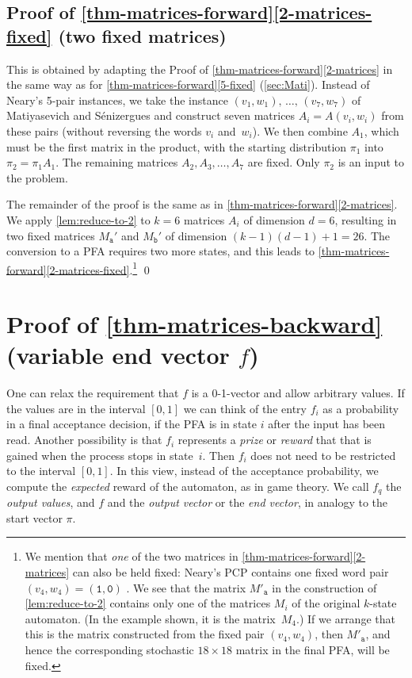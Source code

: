 \documentclass[a4paper,cleveref, autoref, thm-restate]{lipics-v2021}
\newcommand\eeta{f} %
\begin{document}
\subsection{Proof of
  \autoref{thm-matrices-forward}\ref{2-matrices-fixed}  (two fixed matrices)}

This is obtained by adapting the Proof of
\autoref{thm-matrices-forward}\ref{2-matrices}
in the same way as for
\autoref{thm-matrices-forward}\ref{5-fixed}
(\autoref{sec:Mati}).
Instead of Neary's 5-pair instances,
we take the instance
$(v_1,w_1),\,\ldots, \,(v_7,w_7)$
of
 Matiyasevich and S{\'e}nizergues %
and construct seven matrices
$A_i=A(v_i,w_i)$ from these pairs (without reversing the words
$v_i$ and~$w_i$).
We then
combine $A_1$, which must be the first matrix in the product, with the starting
distribution $\pi_1$ into $\pi_2 = \pi_1A_1$.
The remaining matrices $A_2,A_3,\ldots,A_7$ are fixed. Only $\pi_2$
is an input to the problem.

The remainder of the proof is the same as in \autoref{thm-matrices-forward}\ref{2-matrices}.
 We apply
\autoref{lem:reduce-to-2} to
$k=6$ matrices $A_i$ of dimension $d=6$, resulting in two fixed matrices
$M_{\mathtt{a}}'$ and
 $M_{\mathtt{b}}'$
 of dimension
 $(k-1)(d-1)+1=26$.
The conversion to a PFA requires two more states, and this leads to
\autoref{thm-matrices-forward}\ref{2-matrices-fixed}.\footnote
{We mention that \emph{one} of the two matrices in 
  \autoref{thm-matrices-forward}\ref{2-matrices} can also be held fixed:
Neary's PCP contains one fixed word pair
$(v_4,w_4)=(\mathtt{1},\mathtt{0})$
\cite[Theorem~11]{neary:PCP5:2015}.
We see that the matrix $M'_{\mathtt{a}}$ in the construction of
\autoref{lem:reduce-to-2} contains only one of the matrices
$M_i$ of the  original $k$-state automaton. (In the example shown, it is
the matrix~$M_4$.) If we arrange that this is the matrix
constructed from the fixed pair
$(v_4,w_4)$, then  $M'_{\mathtt{a}}$, and hence the corresponding
stochastic $18\times 18$
matrix in the final PFA, will be fixed.}
\qed

 \section{Proof of \autoref{thm-matrices-backward} %
   (variable end %
   vector \texorpdfstring{${f}$}{f})}

One can relax the requirement that $f$ is a 0-1-vector and
allow arbitrary values.
If the values are in the interval $[0,1]$
we can think of the entry $\eeta_i$ as a probability in a final acceptance
decision, if the PFA is in state $i$
after the input has been read.
Another possibility is that
 $\eeta_i$ represents
 a \emph{prize} or \emph{reward} that
that is gained when the process stops
in state~$i$.
Then
 $\eeta_i$
does not need to be restricted to the interval $[0,1]$.
In this view, instead of
the acceptance probability, we compute the \emph{expected} reward
of the automaton, as in game theory.
We call $\eeta_q$
the \emph{output values},
and $\eeta$ and
the \emph{output vector} or
the \emph{end vector}, in analogy to the start vector $\pi$.
\end{document}
